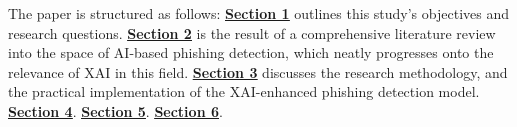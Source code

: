 
\noindent The paper is structured as follows: \hyperref[sec:1-introduction]{\uline{\textbf{Section 1}}} outlines this study's objectives and research questions. \hyperref[sec:2-literature-review]{\uline{\textbf{Section 2}}} is the result of a comprehensive literature review into the space of AI-based phishing detection, which neatly progresses onto the relevance of XAI in this field. \hyperref[sec:3-research-methodology]{\uline{\textbf{Section 3}}} discusses the research methodology, and the practical implementation of the XAI-enhanced phishing detection model. \hyperref[sec:4-results]{\uline{\textbf{Section 4}}}. \hyperref[sec:5-discussion]{\uline{\textbf{Section 5}}}. \hyperref[sec:6-conclusion]{\uline{\textbf{Section 6}}}.
